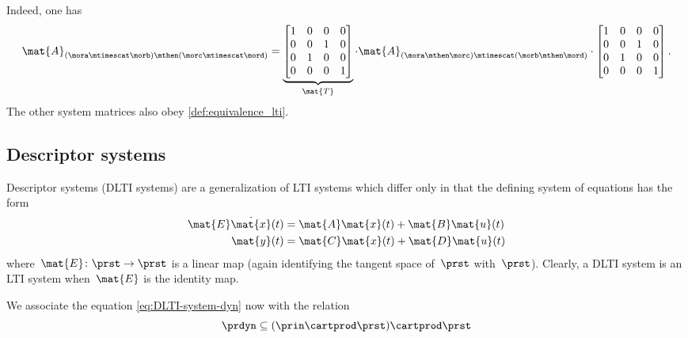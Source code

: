 \begin{example}
    Indeed, one has
    \begin{equation*}
        \mat{A}_{(\mora\mtimescat \morb)\mthen (\morc\mtimescat \mord)}=
        \underbrace{\begin{bmatrix}
                1 & 0 & 0 & 0 \\
                0 & 0 & 1 & 0 \\
                0 & 1 & 0 & 0 \\
                0 & 0 & 0 & 1
            \end{bmatrix}}_{\mat{T}}\cdot
        \mat{A}_{(\mora \mthen \morc)\mtimescat (\morb\mthen \mord)}
        \cdot
        \begin{bmatrix}
            1 & 0 & 0 & 0 \\
            0 & 0 & 1 & 0 \\
            0 & 1 & 0 & 0 \\
            0 & 0 & 0 & 1
        \end{bmatrix}.
    \end{equation*}
    The other system matrices also obey \cref{def:equivalence_lti}.
\end{example}

\subsection{Descriptor systems}

Descriptor systems (DLTI systems) are a generalization of LTI systems which differ only in that the defining system of equations has the form
\begin{align}
    \mat{E} \dot{\mat{x}}(t) & = \mat{A}\mat{x}(t) + \mat{B}\mat{u}(t) \label{eq:DLTI-system-dyn} \\
    \mat{y}(t)               & = \mat{C}\mat{x}(t) + \mat{D}\mat{u}(t) \label{eq:DLTI-system-ro}
\end{align}
where~$\mat{E}\colon \prst \to \prst$ is a linear map (again identifying the tangent space of~$\prst$ with~$\prst$).
Clearly, a DLTI system is an LTI system when~$\mat{E}$ is the identity map.

We associate the equation \cref{eq:DLTI-system-dyn} now with the relation
\begin{equation*}
    \prdyn \subseteq  (\prin \cartprod \prst) \cartprod \prst
\end{equation*}

